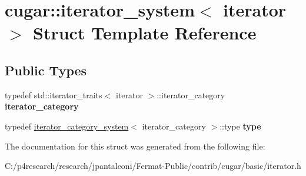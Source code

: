 \hypertarget{structcugar_1_1iterator__system}{}\section{cugar\+:\+:iterator\+\_\+system$<$ iterator $>$ Struct Template Reference}
\label{structcugar_1_1iterator__system}
\subsection*{Public Types}
\begin{DoxyCompactItemize}
\item 
\mbox{\label{structcugar_1_1iterator__system_a5230b411b5fecd60f5ff95d62fd8a6c0}} 
typedef std\+::iterator\+\_\+traits$<$ iterator $>$\+::iterator\+\_\+category {\bfseries iterator\+\_\+category}
\item 
\mbox{\label{structcugar_1_1iterator__system_aa24b310e29f8b3561ce5aa38822b8ee9}} 
typedef \hyperlink{structcugar_1_1iterator__category__system}{iterator\+\_\+category\+\_\+system}$<$ iterator\+\_\+category $>$\+::type {\bfseries type}
\end{DoxyCompactItemize}


The documentation for this struct was generated from the following file\+:\begin{DoxyCompactItemize}
\item 
C\+:/p4research/research/jpantaleoni/\+Fermat-\/\+Public/contrib/cugar/basic/iterator.\+h\end{DoxyCompactItemize}
